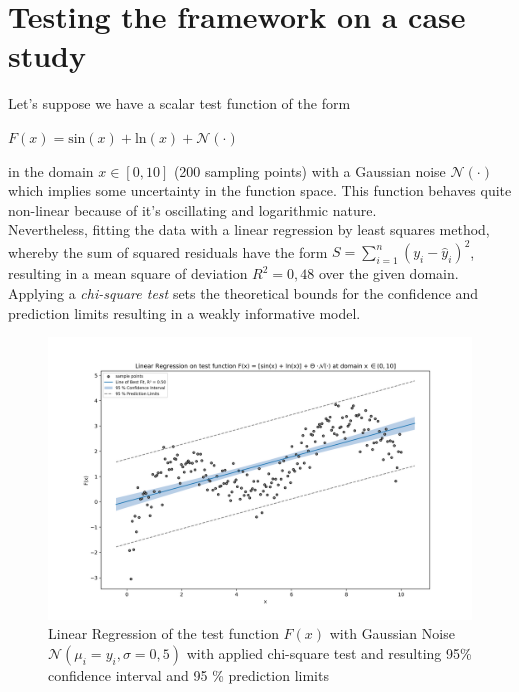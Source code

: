 \documentclass[12pt, a4paper]{article}
\begin{document}

\newpage
\section{Testing the framework on a case study}
Let's suppose we have a scalar test function of the form
\begin{center}
    $F(x) = \text{sin}(x) + \text{ln}(x) + \mathcal{N}(\cdot)$
\end{center}
in the domain $x \in [0, 10]$ (200 sampling points) with a Gaussian noise $\mathcal{N}(\cdot)$ which implies some uncertainty in the function space.
This function behaves quite non-linear because of it's oscillating and logarithmic nature. \\
Nevertheless, fitting the data with a linear regression by least squares method, whereby the sum of squared residuals have the form $S = \sum_{i=1}^{n} (y_i - \hat{y}_i)^2$, resulting in a mean square of deviation $R^2 = 0{,}48$ over the given domain. Applying a \textit{chi-square test} sets the theoretical bounds for the confidence and prediction limits resulting in a weakly informative model.
\begin{figure}[!htpb]
    \centering
    \includegraphics[width=1\textwidth,trim={0 0 0 0},clip]{figures/linear_regression.png}
    \caption[Linear Regression of the test function]{Linear Regression of the test function $F(x)$ with Gaussian Noise $\mathcal{N}(\mu_i = y_i, \sigma = 0{,}5)$ with applied chi-square test and resulting 95\% confidence interval and 95 \% prediction limits}
    \label{fig: linear_regression_testfunction}
\end{figure}
\end{document}
